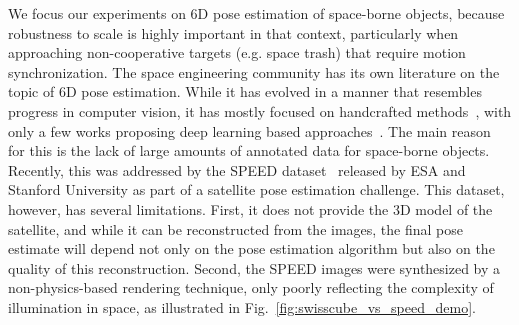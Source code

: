 We focus our experiments on 6D pose estimation of space-borne objects, because robustness to scale is highly important in that context, particularly when approaching non-cooperative targets (e.g. space trash)
that require motion synchronization. The space engineering community has its own literature on the topic of 6D pose estimation. While it has evolved in a manner that resembles progress in computer vision, it has mostly focused on handcrafted methods~\cite{Zhang05b,Amico14,Petit11,Sharma18b}, with only a few works proposing deep learning based approaches~\cite{Chen19DLR}. The main reason for this is the lack of large amounts of annotated data for space-borne objects. 
Recently, this was addressed by the SPEED dataset~\cite{Kisantal20} released by ESA and Stanford University as part of a satellite pose estimation challenge. This dataset, however, has several limitations. First, it does not provide the 3D model of the satellite, and while it can be reconstructed from the images, the final pose estimate will depend not only on the pose estimation algorithm but also on the quality of this reconstruction. 
Second, the SPEED images were synthesized by a non-physics-based rendering technique, only poorly reflecting the complexity of illumination in space, as illustrated in Fig.~\ref{fig:swisscube_vs_speed_demo}. 
